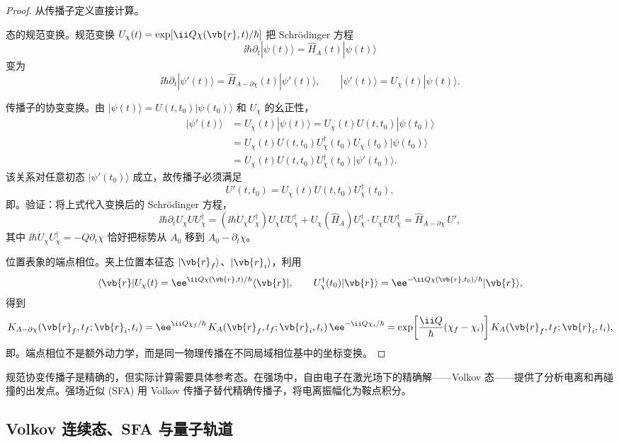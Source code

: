 \begin{proof}
从传播子定义直接计算。

态的规范变换。规范变换 \(U_\chi(t)=\exp[\ii Q\chi(\vb{r},t)/\hbar]\) 把 Schrödinger 方程
\[
 \ii\hbar\partial_t|\psi(t)\rangle=\hat H_A(t)|\psi(t)\rangle
\]
变为
\[
 \ii\hbar\partial_t|\psi'(t)\rangle=\hat H_{A-\partial\chi}(t)|\psi'(t)\rangle,
 \qquad |\psi'(t)\rangle=U_\chi(t)|\psi(t)\rangle.
\]

传播子的协变变换。由 \(|\psi(t)\rangle=U(t,t_0)|\psi(t_0)\rangle\) 和 \(U_\chi\) 的幺正性，
\[
 \begin{aligned}
 |\psi'(t)\rangle
 &=U_\chi(t)|\psi(t)\rangle
 =U_\chi(t)U(t,t_0)|\psi(t_0)\rangle\\
 &=U_\chi(t)U(t,t_0)U_\chi^\dagger(t_0)U_\chi(t_0)|\psi(t_0)\rangle\\
 &=U_\chi(t)U(t,t_0)U_\chi^\dagger(t_0)|\psi'(t_0)\rangle.
 \end{aligned}
\]
该关系对任意初态 \(|\psi'(t_0)\rangle\) 成立，故传播子必须满足
\[
 U'(t,t_0)=U_\chi(t)U(t,t_0)U_\chi^\dagger(t_0),
\]
即。验证：将上式代入变换后的 Schrödinger 方程，
\[
 \ii\hbar\partial_tU_\chi UU_\chi^\dagger
 =(\ii\hbar\dot U_\chi U_\chi^\dagger)U_\chi UU_\chi^\dagger
 +U_\chi(\hat H_A)U_\chi^\dagger\cdot U_\chi UU_\chi^\dagger
 =\hat H_{A-\partial\chi}\,U',
\]
其中 \(\ii\hbar\dot U_\chi U_\chi^\dagger=-Q\partial_t\chi\) 恰好把标势从 \(A_0\) 移到 \(A_0-\partial_t\chi\)。

位置表象的端点相位。夹上位置本征态 \(|\vb{r}_f\rangle\)、\(|\vb{r}_i\rangle\)，利用
\[
 \langle\vb{r}|U_\chi(t)
 =\ee^{\ii Q\chi(\vb{r},t)/\hbar}\langle\vb{r}|,
 \qquad
 U_\chi^\dagger(t_0)|\vb{r}\rangle
 =\ee^{-\ii Q\chi(\vb{r},t_0)/\hbar}|\vb{r}\rangle,
\]
得到
\[
 K_{A-\partial\chi}(\vb{r}_f,t_f;\vb{r}_i,t_i)
 =\ee^{\ii Q\chi_f/\hbar}\,K_A(\vb{r}_f,t_f;\vb{r}_i,t_i)\,\ee^{-\ii Q\chi_i/\hbar}
 =\exp\!\left[\frac{\ii Q}{\hbar}(\chi_f-\chi_i)\right]K_A(\vb{r}_f,t_f;\vb{r}_i,t_i),
\]
即。端点相位不是额外动力学，而是同一物理传播在不同局域相位基中的坐标变换。
\end{proof}

规范协变传播子是精确的，但实际计算需要具体参考态。在强场中，自由电子在激光场下的精确解——Volkov 态——提供了分析电离和再碰撞的出发点。强场近似 (SFA) 用 Volkov 传播子替代精确传播子，将电离振幅化为鞍点积分。

\subsection{Volkov 连续态、SFA 与量子轨道}

